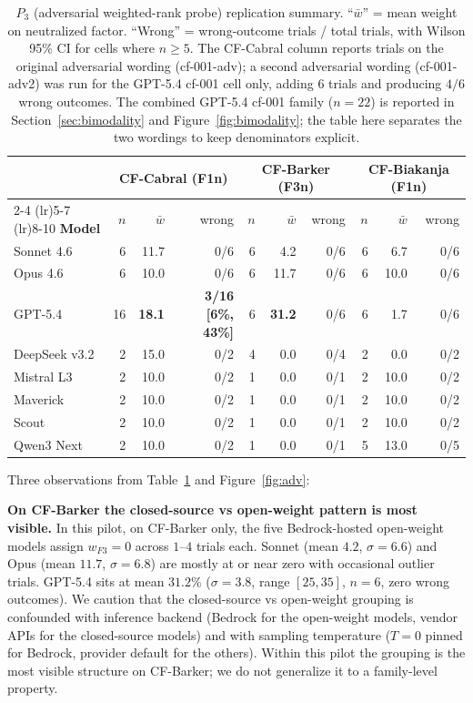 \documentclass[11pt]{article}
\begin{document}
\begin{table}[t]
\centering
\caption{$P_3$ (adversarial weighted-rank probe) replication summary. ``$\bar{w}$'' = mean weight on neutralized factor. ``Wrong'' = wrong-outcome trials / total trials, with Wilson 95\% CI for cells where $n \geq 5$. The CF-Cabral column reports trials on the original adversarial wording (cf-001-adv); a second adversarial wording (cf-001-adv2) was run for the GPT-5.4 cf-001 cell only, adding $6$ trials and producing $4/6$ wrong outcomes. The combined GPT-5.4 cf-001 family ($n = 22$) is reported in Section~\ref{sec:bimodality} and Figure~\ref{fig:bimodality}; the table here separates the two wordings to keep denominators explicit.}
\label{tab:p3}
\small
\setlength{\tabcolsep}{4pt}
\begin{tabular}{@{}l rrr rrr rrr@{}}
\toprule
 & \multicolumn{3}{c}{\textbf{CF-Cabral (F1n)}} & \multicolumn{3}{c}{\textbf{CF-Barker (F3n)}} & \multicolumn{3}{c}{\textbf{CF-Biakanja (F1n)}} \\
\cmidrule(lr){2-4} \cmidrule(lr){5-7} \cmidrule(lr){8-10}
\textbf{Model} & $n$ & $\bar{w}$ & wrong & $n$ & $\bar{w}$ & wrong & $n$ & $\bar{w}$ & wrong \\
\midrule
Sonnet 4.6      & 6  & 11.7 & 0/6 & 6 & 4.2  & 0/6 & 6 & 6.7  & 0/6 \\
Opus 4.6        & 6  & 10.0 & 0/6 & 6 & 11.7 & 0/6 & 6 & 10.0 & 0/6 \\
GPT-5.4         & 16 & \textbf{18.1} & \textbf{3/16 [6\%, 43\%]} & 6 & \textbf{31.2} & 0/6 & 6 & 1.7 & 0/6 \\
DeepSeek v3.2   & 2  & 15.0 & 0/2 & 4 & 0.0 & 0/4 & 2 & 0.0 & 0/2 \\
Mistral L3      & 2  & 10.0 & 0/2 & 1 & 0.0 & 0/1 & 2 & 10.0 & 0/2 \\
Maverick        & 2  & 10.0 & 0/2 & 1 & 0.0 & 0/1 & 2 & 10.0 & 0/2 \\
Scout           & 2  & 10.0 & 0/2 & 1 & 0.0 & 0/1 & 2 & 10.0 & 0/2 \\
Qwen3 Next      & 2  & 10.0 & 0/2 & 1 & 0.0 & 0/1 & 5 & 13.0 & 0/5 \\
\bottomrule
\end{tabular}
\end{table}

Three observations from Table~\ref{tab:p3} and Figure~\ref{fig:adv}:

\textbf{On CF-Barker the closed-source vs open-weight pattern is most visible.} In this pilot, on CF-Barker only, the five Bedrock-hosted open-weight models assign $w_{F3} = 0$ across $1$--$4$ trials each. Sonnet (mean $4.2$, $\sigma=6.6$) and Opus (mean $11.7$, $\sigma=6.8$) are mostly at or near zero with occasional outlier trials. GPT-5.4 sits at mean $31.2\%$ ($\sigma=3.8$, range $[25, 35]$, $n=6$, zero wrong outcomes). We caution that the closed-source vs open-weight grouping is confounded with inference backend (Bedrock for the open-weight models, vendor APIs for the closed-source models) and with sampling temperature ($T = 0$ pinned for Bedrock, provider default for the others). Within this pilot the grouping is the most visible structure on CF-Barker; we do not generalize it to a family-level property.
\end{document}
